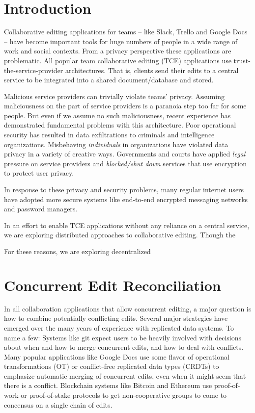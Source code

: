 \documentclass[runningheads]{llncs}
\begin{document}
\section{Introduction}

Collaborative editing applications for teams -- like Slack, Trello and Google Docs -- have become important tools for huge numbers of people in a wide range of work and social contexts.
From a privacy perspective these applications are problematic.
All popular team collaborative editing (TCE) applications use trust-the-service-provider architectures.
That is, clients send their edits to a central service to be integrated into a shared document{\slash}database and stored.

Malicious service providers can trivially violate teams' privacy.
Assuming maliciousness on the part of service providers is a paranoia step too far for some people.
But even if we assume no such maliciousness, recent experience has demonstrated fundamental problems with this architecture.
Poor operational security has resulted in data exfiltrations to criminals and intelligence organizations.
Misbehaving \emph{individuals} in organizations have violated data privacy in a variety of creative ways.
Governments and courts have applied \emph{legal} pressure on service providers and \emph{blocked{\slash}shut down} services that use encryption to protect user privacy.

In response to these privacy and security problems, many regular internet users have adopted more secure systems like end-to-end encrypted messaging networks and password managers.


In an effort to enable TCE applications without any reliance on a central service, we are exploring distributed approaches to collaborative editing.
Though the

For these reasons, we are exploring decentralized

\section{Concurrent Edit Reconciliation}

In all collaboration applications that allow concurrent editing, a major question is how to combine potentially conflicting edits.
Several major strategies have emerged over the many years of experience with replicated data systems.
To name a few:
Systems like git expect users to be heavily involved with decisions about when and how to merge concurrent edits, and how to deal with conflicts.
Many popular applications like Google Docs use some flavor of operational transformations (OT) or conflict-free replicated data types (CRDTs) to emphasize automatic merging of concurrent edits, even when it might seem that there is a conflict.
Blockchain systems like Bitcoin and Ethereum use proof-of-work or proof-of-stake protocols to get non-cooperative groups to come to concensus on a single chain of edits.
\end{document}
